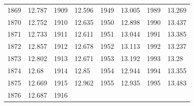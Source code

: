 \begin{description}[noitemsep]
\begin{description}[noitemsep]
\begin{table}
\begin{center}
\begin{xtabular}[t]{|l|l|l|l|l|l|l|l|}
        	1869	 &
        	12.787	 &
        	1909	 &
        	12.596	 &
        	1949	 &
        	13.005	 &
        	1989	 &
        	13.269	%
     \tabularnewline{}
        	1870	 &
        	12.752	 &
        	1910	 &
        	12.635	 &
        	1950	 &
        	12.898	 &
        	1990	 &
        	13.437	%
     \tabularnewline{}
        	1871	 &
        	12.733	 &
        	1911	 &
        	12.611	 &
        	1951	 &
        	13.044	 &
        	1991	 &
        	13.385	%
     \tabularnewline{}
        	1872	 &
        	12.857	 &
        	1912	 &
        	12.678	 &
        	1952	 &
        	13.113	 &
        	1992	 &
        	13.237	%
     \tabularnewline{}
        	1873	 &
        	12.802	 &
        	1913	 &
        	12.671	 &
        	1953	 &
        	13.192	 &
        	1993	 &
        	13.28	%
     \tabularnewline{}
        	1874	 &
        	12.68	 &
        	1914	 &
        	12.85	 &
        	1954	 &
        	12.944	 &
        	1994	 &
        	13.355	%
     \tabularnewline{}
        	1875	 &
        	12.669	 &
        	1915	 &
        	12.962	 &
        	1955	 &
        	12.935	 &
        	1995	 &
        	13.483	%
     \tabularnewline{}
        	1876	 &
        	12.687	 &
        	1916	 &

\end{xtabular}
\end{center}
\end{table}
\end{description}
\end{description}
